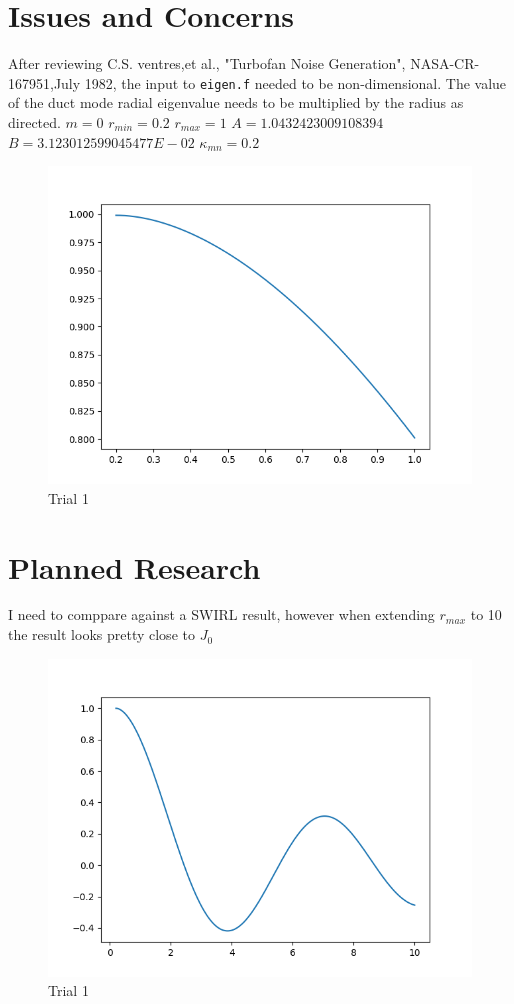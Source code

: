 \documentclass[12pt]{article}
\begin{document}
\section{Issues and Concerns}
After reviewing C.S. ventres,et al., "Turbofan Noise Generation", NASA-CR-167951,July 1982,
the input to  \verb|eigen.f| needed to be non-dimensional. The value of the duct mode
radial eigenvalue needs to be multiplied by the radius as directed. 
$m = 0$
$r_{min} = 0.2 $ 
$r_{max} = 1$
 $A= 1.0432423009108394$
 $B= 3.123012599045477E-02$
 $\kappa_{mn} =0.2$
 \begin{figure}
     \centering
     \includegraphics{Figure_1_example.png}
     \caption{Trial 1}
 \end{figure}
\section{Planned Research}
I need to comppare against a SWIRL result, however when extending $r_{max}$ to 10
the result looks pretty close to $J_0$
 \begin{figure}
     \centering
     \includegraphics{Figure_1.png}
     \caption{Trial 1}
 \end{figure}
\end{document}
